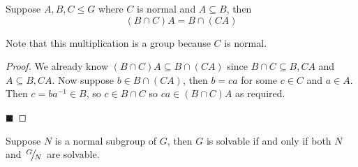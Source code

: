 \documentclass[10pt]{article}
\def\slfrac#1#2{\left.{}^{#1}\mkern-4mu\middle/\mkern-3mu{}_{#2}\right.}
\begin{document}
\begin{lemm*}

    Suppose $A,B,C\leq G$ where $C$ is normal and $A\subseteq B$, then
    \[ (B\cap C)A = B\cap(CA) \]

\end{lemm*}

Note that this multiplication is a group because $C$ is normal.

\begin{proof}

    We already know $(B\cap C)A\subseteq B\cap(CA)$ since $B\cap C\subseteq B, CA$ and $A\subseteq B,CA$.
    Now suppose $b\in B\cap(CA)$, then $b=ca$ for some $c\in C$ and $a\in A$.
    Then $c=ba^{-1}\in B$, so $c\in B\cap C$ so $ca\in(B\cap C)A$ as required.

    \hfill$\blacksquare$

\end{proof}

\begin{prop*}

    Suppose $N$ is a normal subgroup of $G$, then $G$ is solvable if and only if both $N$ and $\slfrac GN$ are solvable.

\end{prop*}
\end{document}
